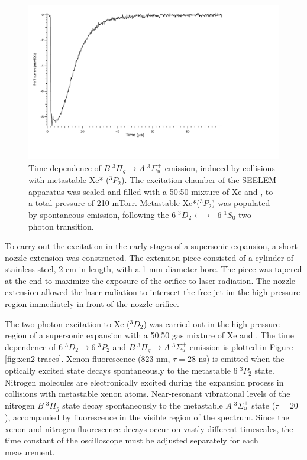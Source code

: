 \begin{figure}
  \caption{Time dependence of  $B \; ^3\Pi_g \rightarrow A \; ^3\Sigma_u^+$ emission,
    induced by collisions with metastable Xe* ($^3P_2$).  The
    excitation chamber of the SEELEM apparatus was sealed and filled
    with a 50:50 mixture of Xe and , to a total pressure of 210
    mTorr.  Metastable Xe*($^3P_2$) was populated by spontaneous
    emission, following the $6\;^3D_2 \leftarrow \leftarrow 6\;^1S_0$
    two-photon transition.}
  \label{fig:xen2-firstlight}
  \vspace{1cm}
  \centering
  \includegraphics[width=7in]{XeN2-firstlight.pdf}
  \vspace{2in}
\end{figure}

To carry out the excitation in the early stages of a supersonic
expansion, a short nozzle extension was constructed.  The extension
piece consisted of a cylinder of stainless steel, 2 cm in length, with
a 1 mm diameter bore.  The piece was tapered at the end to maximize
the exposure of the orifice to laser radiation.  The nozzle extension
allowed the laser radiation to intersect the free jet im the high
pressure region immediately in front of the nozzle orifice.

The two-photon excitation to Xe ($^3D_2$) was carried out in the
high-pressure region of a supersonic expansion with a 50:50 gas
mixture of Xe and .  The time dependence of  $6\;^3D_2
\rightarrow 6\;^3P_2$ and  $B \; ^3\Pi_g \rightarrow A \; ^3\Sigma_u^+$
emission is plotted in Figure \ref{fig:xen2-traces}.  Xenon
fluorescence (823 nm, $\tau=28$ ns) is emitted when the optically
excited state decays spontaneously to the metastable $6\;^3P_2$ state.
Nitrogen molecules are electronically excited during the expansion
process in collisions with metastable xenon atoms.  Near-resonant
vibrational levels of the nitrogen $B \; ^3\Pi_g$ state decay
spontaneously to the metastable $A \; ^3\Sigma_u^+$ state ($\tau=20$
\microsec), accompanied by fluorescence in the visible region of the
spectrum.  Since the xenon and nitrogen fluorescence decays occur on
vastly different timescales, the time constant of the oscilloscope
must be adjusted separately for each measurement.

